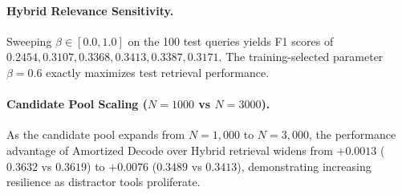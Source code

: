 \paragraph{Hybrid Relevance Sensitivity.}
Sweeping $\beta \in [0.0, 1.0]$ on the 100 test queries yields F1 scores of $0.2454, 0.3107, 0.3368, \mathbf{0.3413}, 0.3387, 0.3171$. The training-selected parameter $\beta=0.6$ exactly maximizes test retrieval performance.

\paragraph{Candidate Pool Scaling ($N=1000$ vs $N=3000$).}
As the candidate pool expands from $N=1,000$ to $N=3,000$, the performance advantage of Amortized Decode over Hybrid retrieval widens from $+0.0013$ ($0.3632$ vs $0.3619$) to $+0.0076$ ($0.3489$ vs $0.3413$), demonstrating increasing resilience as distractor tools proliferate.
